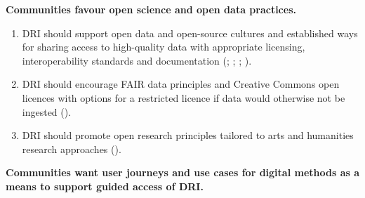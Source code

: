 \documentclass[11pt]{scrartcl}
\begin{document}
\noindent\textbf{Communities favour open science and open data practices.}

\begin{enumerate}[resume]
\item DRI should support open data and open-source cultures and established ways for sharing access to high-quality data with appropriate licensing, interoperability standards and documentation 
(\cite[17]{de_roure_2022_4716148}; \cite[2]{bell_2025_17099176}; \cite[58]{shoaib_sufi_2023_7686348}; \cite[1,2]{hawkins_2024_14006955}).   

\item\label{itm:cc0} DRI should encourage FAIR data principles and Creative Commons open licences with options for a restricted licence if data would otherwise not be ingested (\cite[4,21]{Zwiggelaar22}).  

\item DRI should promote open research principles tailored to arts and humanities research approaches 
(\cite[51]{taylor_2022_10518740}).
  
\end{enumerate}



\noindent\textbf{Communities want user journeys and use cases for digital methods as a means to support guided access of DRI.}
\end{document}
